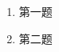 \documentclass[ebook]{problemset}
\begin{document}
\begin{enumerate}
  \item 第一题
\begin{solution}
    \zhlipsum[1]
\end{solution}
  \item 第二题
\begin{solution}
    \zhlipsum[2]
\end{solution}
\end{enumerate}
\end{document}
